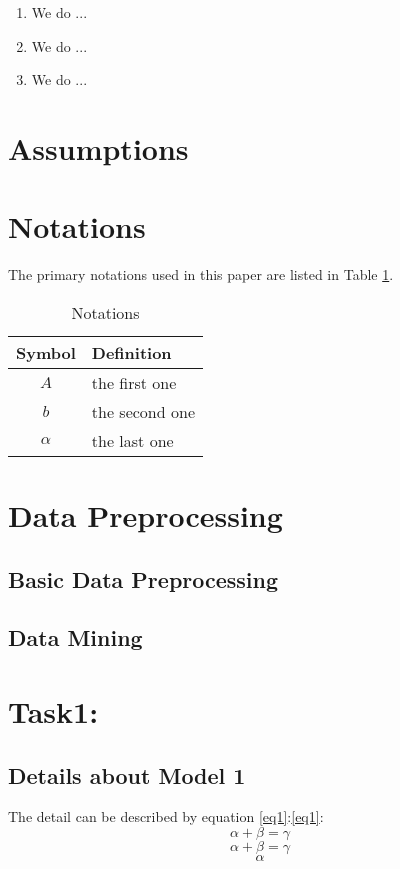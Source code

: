 \documentclass[12pt]{article}  %
\begin{document}
\begin{enumerate}[\bfseries 1.]
    \item We do ...
    \item We do ...
    \item We do ...
\end{enumerate}

\section{Assumptions}


\section{Notations}
The primary notations used in this paper are listed in Table \ref{tb:notation}.

\begin{table}[!htbp]
\begin{center}
\caption{Notations}
\begin{tabular}{cl}
	\toprule
	\multicolumn{1}{m{3cm}}{\centering Symbol}
	&\multicolumn{1}{m{8cm}}{\centering Definition}\\
	\midrule
	$A$&the first one\\
	$b$&the second one\\
	$\alpha$ &the last one\\
	\bottomrule
\end{tabular}\label{tb:notation}
\end{center}
\end{table}

\section{Data Preprocessing}
\subsection{Basic Data Preprocessing}
\subsection{Data Mining}
\section{Task1:}
\subsection{Details about Model 1}
The detail can be described by equation \eqref{eq1}:\autoref{eq1}:
\begin{equation}\label{eq1}
\alpha+\beta=\gamma
\end{equation}
\[
\alpha+\beta=\gamma
\]
$$\alpha$$
\end{document}
